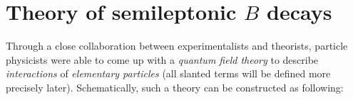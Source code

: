 


\chapter{Theory of semileptonic $B$ decays}
\label{ref:theory}

Through a close collaboration between experimentalists and theorists,
particle physicists were able to come up with a \emph{quantum field theory}
to describe \emph{interactions} of \emph{elementary particles}
(all slanted terms will be defined more precisely later).
Schematically, such a theory can be constructed as following:

